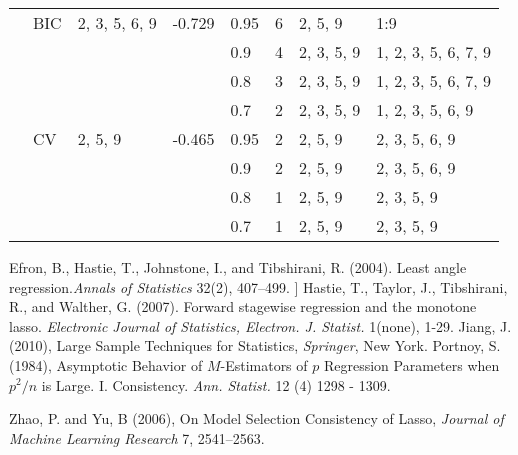\documentclass[10pt]{book}
\theoremstyle{definition}
\begin{document}
\begin{table}[!htbp]
{\begin{tabular}{|llllllll|}
               & BIC  & 2, 3, 5, 6, 9 & -0.729 & 0.95 & 6     & 2, 5, 9     & 1:9 \\
               &      &               &        & 0.9  & 4     & 2, 3, 5, 9     & 1, 2, 3, 5, 6, 7, 9    \\
               &      &               &        & 0.8  & 3     & 2, 3, 5, 9  & 1, 2, 3, 5, 6, 7, 9       \\
               &      &               &        & 0.7  & 2     & 2, 3, 5, 9  & 1, 2, 3, 5, 6, 9       \\
               & CV   & 2, 5, 9 & -0.465 & 0.95 & 2     &  2, 5, 9        & 2, 3, 5, 6,  9    \\
               &      &               &        & 0.9  & 2     & 2, 5, 9        & 2, 3, 5, 6, 9       \\
               &      &               &        & 0.8  & 1     & 2, 5, 9        & 2, 3, 5, 9          \\
               &      &               &        & 0.7  & 1     & 2, 5, 9     & 2, 3, 5, 9          \\ \hline
\end{tabular}%
}
\end{table}


\begin{thebibliography}{}
Efron, B., Hastie, T., Johnstone, I., and Tibshirani, R. (2004). Least angle regression.{\it Annals of Statistics} 32(2), 407–499.
]
Hastie, T., Taylor, J., Tibshirani, R., and Walther, G. (2007). Forward stagewise regression and the monotone lasso. {\it Electronic Journal of Statistics, Electron. J. Statist.} 1(none), 1-29.
Jiang, J. (2010), Large Sample Techniques for Statistics, {\it Springer}, New York.
Portnoy, S.(1984), Asymptotic Behavior of $M$-Estimators of  $p$
 Regression Parameters when $p^2/n$ is Large. I. Consistency. {\it Ann. Statist.} 12 (4) 1298 - 1309. 
 
Zhao, P. and Yu, B (2006),  On Model Selection Consistency of Lasso, {\it Journal of Machine Learning Research} 7, 2541--2563.

\end{thebibliography}
\end{document}
